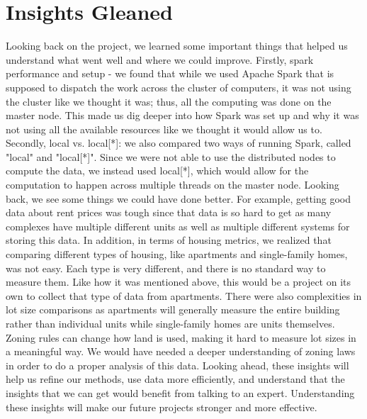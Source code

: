 \documentclass[titlepage]{article}
\begin{document}
\section{Insights Gleaned}
Looking back on the project, we learned some important things that helped us understand what went well and where we could improve. Firstly, spark performance and setup - we found that while we used Apache Spark that is supposed to dispatch the work across the cluster of computers, it was not using the cluster like we thought it was; thus, all the computing was done on the master node. This made us dig deeper into how Spark was set up and why it was not using all the available resources like we thought it would allow us to. Secondly, local vs. local[*]: we also compared two ways of running Spark, called "local" and "local[*]". Since we were not able to use the distributed nodes to compute the data, we instead used local[*], which would allow for the computation to happen across multiple threads on the master node. Looking back, we see some things we could have done better. For example, getting good data about rent prices was tough since that data is so hard to get as many complexes have multiple different units as well as multiple different systems for storing this data. In addition, in terms of housing metrics, we realized that comparing different types of housing, like apartments and single-family homes, was not easy. Each type is very different, and there is no standard way to measure them. Like how it was mentioned above, this would be a project on its own to collect that type of data from apartments. There were also complexities in lot size comparisons as apartments will generally measure the entire building rather than individual units while single-family homes are units themselves. Zoning rules can change how land is used, making it hard to measure lot sizes in a meaningful way. We would have needed a deeper understanding of zoning laws in order to do a proper analysis of this data. Looking ahead, these insights will help us refine our methods, use data more efficiently, and understand that the insights that we can get would benefit from talking to an expert. Understanding these insights will make our future projects stronger and more effective.
\end{document}
